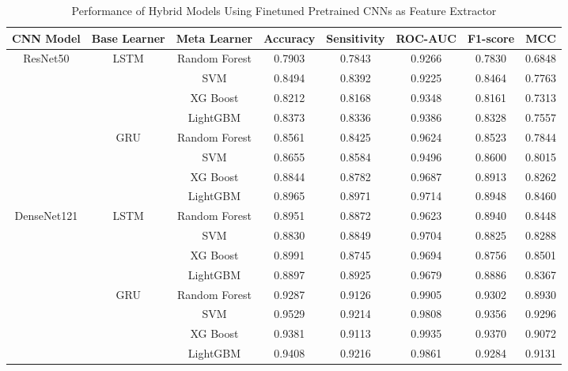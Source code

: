 \documentclass{elektr}
\begin{document}
\begin{table}[t]
	\centering
	\caption{Performance of Hybrid Models Using Finetuned Pretrained CNNs as Feature Extractor}
	\label{tab:cnn_finetuned_hybrid_performance}
	\begin{tabular}{|c|c|c|c|c|c|c|c|}
		\hline
		\textbf{CNN Model} & \textbf{Base Learner} & \textbf{Meta Learner} & \textbf{Accuracy} & \textbf{Sensitivity} & \textbf{ROC-AUC} & \textbf{F1-score} & \textbf{MCC}\\
		\hline
		
		\multirow{8}{*}{ResNet50} 
		& \multirow{4}{*}{LSTM} & Random Forest & 0.7903 & 0.7843 & 0.9266 & 0.7830 & 0.6848 \\
		&                       & SVM           & 0.8494 & 0.8392 & 0.9225 & 0.8464 & 0.7763 \\
		&                       & XG Boost      & 0.8212 & 0.8168 & 0.9348 & 0.8161 & 0.7313 \\
		&                       & LightGBM      & 0.8373 & 0.8336 & 0.9386 & 0.8328 & 0.7557 \\
		\cline{2-8}
		& \multirow{4}{*}{GRU}  & Random Forest & 0.8561 & 0.8425 & 0.9624 & 0.8523 & 0.7844 \\
		&                       & SVM           & 0.8655 & 0.8584 & 0.9496 & 0.8600 & 0.8015 \\
		&                       & XG Boost      & 0.8844 & 0.8782 & 0.9687 & 0.8913 & 0.8262 \\
		&                       & LightGBM      & 0.8965 & 0.8971 & 0.9714 & 0.8948 & 0.8460 \\
		\hline
		
		\multirow{8}{*}{DenseNet121} 
		& \multirow{4}{*}{LSTM} & Random Forest & 0.8951 & 0.8872 & 0.9623 & 0.8940 & 0.8448 \\
		&                       & SVM           & 0.8830 & 0.8849 & 0.9704 & 0.8825 & 0.8288 \\
		&                       & XG Boost      & 0.8991 & 0.8745 & 0.9694 & 0.8756 & 0.8501 \\
		&                       & LightGBM      & 0.8897 & 0.8925 & 0.9679 & 0.8886 & 0.8367 \\
		\cline{2-8}
		& \multirow{4}{*}{GRU}  & Random Forest & 0.9287 & 0.9126 & 0.9905 & 0.9302 & 0.8930 \\
		&                       & SVM           & 0.9529 & 0.9214 & 0.9808 & 0.9356 & 0.9296 \\
		&                       & XG Boost      & 0.9381 & 0.9113 & 0.9935 & 0.9370 & 0.9072 \\
		&                       & LightGBM      & 0.9408 & 0.9216 & 0.9861 & 0.9284 & 0.9131 \\
		\hline
		

\end{tabular}
\end{table}
\end{document}
